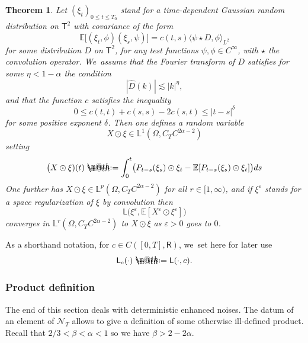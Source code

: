 \documentclass[10pt]{amsart}
\makeatletter
\newtheorem{thm}{Theorem}
\theoremstyle{definition}
\let\epsilon\varepsilon
\newcommand\bbE{\mathbb{E}}
\newcommand\bbR{\mathbf{\mathsf{R}}}
\newcommand{\mcN}{\mathcal{N}}
\newcommand{\bbL}{\mathbb{L}}
\newcommand*{\defeq}{\mathrel{\rlap{%
\raisebox{0.3ex}{$\m@th\cdot$}}%
\raisebox{-0.3ex}{$\m@th\cdot$}}%
=}
\makeatother
\begin{document}
\begin{thm} \label{ThmNoiseEnhancement}
Let $(\xi_t)_{0\leq t\leq T_0}$ stand for a time-dependent Gaussian random distribution on $\mathsf{T}^2$ with covariance of the form
\[
\bbE\bigl[(\xi_t,\phi)(\xi_s,\psi)\bigr] = c(t,s) \langle \psi\star D, \phi\rangle_{L^2}
\]
for some distribution $D$ on $\mathsf{T}^2$, for any test functions $\psi,\phi\in C^\infty$, with $\star$ the convolution operator. We~assume that the Fourier transform of $D$ satisfies for some $\eta< 1-\alpha$ the condition
\[
|\widehat{D}(k)| \lesssim |k|^\eta,
\]
and that the function $c$ satisfies the inequality
\[
0\leq c(t,t) + c(s,s) - 2c(s,t) \leq \vert t-s\vert^\delta
\]
for some positive exponent $\delta$. Then one defines a random variable
\[
X\odot \xi\in \bbL^1(\Omega, C_TC^{2\alpha-2})
\]
setting
\begin{equation} \label{EqDefnXOdotXi}
\bigl(X\odot\xi)(t) \defeq \int_0^t \bigl( P_{t-s}(\xi_s)\odot \xi_t - \bbE[P_{t-s}(\xi_s)\odot \xi_t]\bigr)ds
\end{equation}
One further has $X\odot \xi\in \bbL^p(\Omega, C_TC^{2\alpha-2})$ for all $r\in[1,\infty)$, and if $\xi^\epsilon$ stands for a space regularization of $\xi$ by convolution then
\[
\mathsf{L}\bigl(\xi^\epsilon, \bbE[X^\epsilon \odot \xi^\epsilon]\bigr)
\]
converges in $\bbL^r(\Omega, C_TC^{2\alpha-2})$ to $X\odot \xi$ as $\epsilon>0$ goes to $0$.
\end{thm}

As a shorthand notation, for $c\in C([0,T],\bbR)$, we~set here for later use
\begin{equation} \label{EqDefnLc}
\mathsf{L}_c(\cdot) \defeq \mathsf{L}(\cdot,c).
\end{equation}

\subsubsection{Product definition} The end of this section deals with deterministic enhanced noises. The datum of an element of ${{\boldsymbol{\mcN}}_T}$ allows to give a definition of some otherwise ill-defined product. Recall that $2/3<\beta<\alpha<1$ so we have $\beta>2-2\alpha$.
\end{document}
